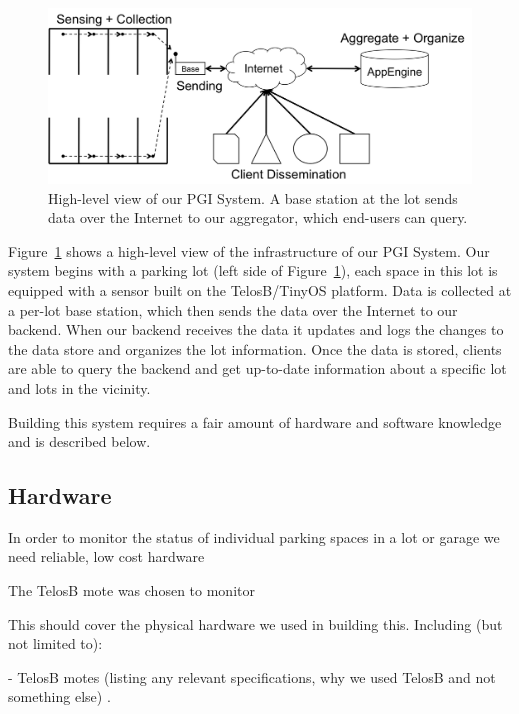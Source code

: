 \documentclass{acm_proc}
\begin{document}
\begin{figure}
    \begin{center}
		\includegraphics[width=\columnwidth]{figures/high-level}
	\end{center}
	\caption{High-level view of our PGI System. A base station at the lot
	sends data over the Internet to our aggregator, which end-users can
	query.}
	\label{fig:high-level}
\end{figure}

Figure~\ref{fig:high-level} shows a high-level view of the infrastructure
of our PGI System.
Our system begins with a parking lot (left side of
Figure~\ref{fig:high-level}), each space in this lot is equipped with a
sensor built on the TelosB/TinyOS platform.
Data is collected at a per-lot base station, which then sends the data over
the Internet to our backend.
When our backend receives the data it updates and logs the changes to the
data store and organizes the lot information.
Once the data is stored, clients are able to query the backend and get
up-to-date information about a specific lot and lots in the vicinity.

Building this system requires a fair amount of hardware and software
knowledge and is described below.

\subsection{Hardware}

In order to monitor the status of individual parking spaces in a lot or garage we need reliable, low cost hardware

The TelosB mote was chosen to monitor 

This should cover the physical hardware we used in building this.
Including (but not limited to):

- TelosB motes (listing any relevant specifications, why we used TelosB
 and not something else) \cite{xbow:telosb-datasheet}.
\end{document}
